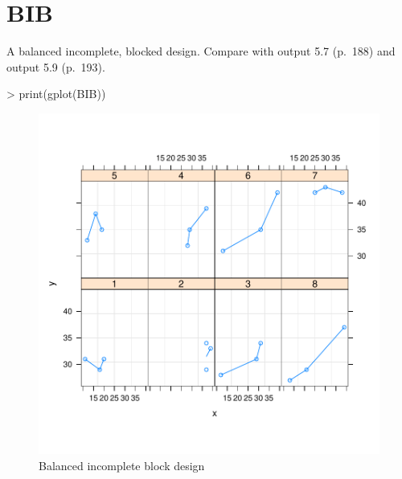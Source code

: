\documentclass[12pt]{article}
\begin{document}
\section{BIB}
\label{sec:BIB}

A balanced incomplete, blocked design.  Compare with output 5.7
(p.~188) and output 5.9 (p.~193).
\begin{Schunk}
\begin{Sinput}
> print(gplot(BIB))
\end{Sinput}
\end{Schunk}
\begin{figure}[tbp]
  \centering
  \includegraphics{figs/f-bib1}
  \caption{Balanced incomplete block design}
  \label{fig:bib1}
\end{figure}
\end{document}
